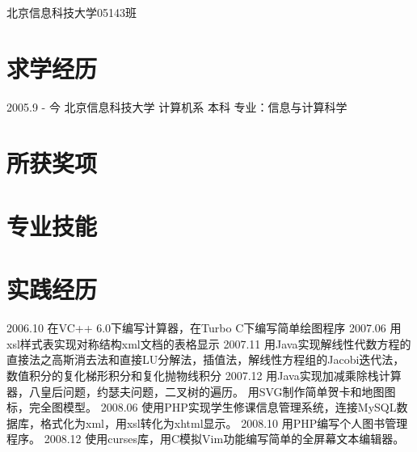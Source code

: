 \documentclass[a4paper]{moderncvwutao}
\begin{document}
\begin{CJK*}{UTF8}{gbsn}


\familyname{}
\title{}
\address{\Writinghand 北京市北四环中路35号}{北京信息科技大学05143班}
 

\maketitle

\section{求学经历}
\cventry
{
	2005.9 - 今
}
{
	北京信息科技大学
}
{
	计算机系
}
{
	本科
}
{
	专业：信息与计算科学
}{}

\section{所获奖项}
\section{专业技能}
\section{实践经历}
\cvitem
{
	2006.10
}
{
	在VC++ 6.0下编写计算器，在Turbo C下编写简单绘图程序
}
\cvitem
{
	2007.06
}
{
	用xsl样式表实现对称结构xml文档的表格显示
}
\cvitem
{
	2007.11
}
{
	用Java实现解线性代数方程的直接法之高斯消去法和直接LU分解法，插值法，解线性方程组的Jacobi迭代法，数值积分的复化梯形积分和复化抛物线积分
}
\cvitem
{
	2007.12
}
{
	用Java实现加减乘除栈计算器，八皇后问题，约瑟夫问题，二叉树的遍历。
		用SVG制作简单贺卡和地图图标，完全图模型。
}
\cvitem
{
	2008.06
}
{
使用PHP实现学生修课信息管理系统，连接MySQL数据库，格式化为xml，用xsl转化为xhtml显示。
}
\cvitem
{
	2008.10
}
{
		用PHP编写个人图书管理程序。
}
\cvitem
{
	2008.12
}
{
	使用curses库，用C模拟Vim功能编写简单的全屏幕文本编辑器。
}

\end{CJK*}
\end{document}
